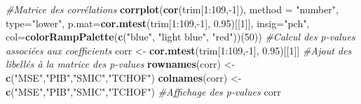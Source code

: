 \documentclass[11pt,]{article}
\newenvironment{Shaded}{\begin{snugshade}}{\end{snugshade}}
\newcommand{\KeywordTok}[1]{\textcolor[rgb]{0.13,0.29,0.53}{\textbf{{#1}}}}
\newcommand{\DataTypeTok}[1]{\textcolor[rgb]{0.13,0.29,0.53}{{#1}}}
\newcommand{\DecValTok}[1]{\textcolor[rgb]{0.00,0.00,0.81}{{#1}}}
\newcommand{\FloatTok}[1]{\textcolor[rgb]{0.00,0.00,0.81}{{#1}}}
\newcommand{\StringTok}[1]{\textcolor[rgb]{0.31,0.60,0.02}{{#1}}}
\newcommand{\CommentTok}[1]{\textcolor[rgb]{0.56,0.35,0.01}{\textit{{#1}}}}
\newcommand{\NormalTok}[1]{{#1}}
\begin{document}
\begin{Shaded}
\begin{Highlighting}[]
\CommentTok{#Matrice des corrélations}
\KeywordTok{corrplot}\NormalTok{(}\KeywordTok{cor}\NormalTok{(trim[}\DecValTok{1}\NormalTok{:}\DecValTok{109}\NormalTok{,-}\DecValTok{1}\NormalTok{]), }\DataTypeTok{method =} \StringTok{"number"}\NormalTok{, }\DataTypeTok{type=}\StringTok{"lower"}\NormalTok{,}
         \DataTypeTok{p.mat=}\KeywordTok{cor.mtest}\NormalTok{(trim[}\DecValTok{1}\NormalTok{:}\DecValTok{109}\NormalTok{,-}\DecValTok{1}\NormalTok{], }\FloatTok{0.95}\NormalTok{)[[}\DecValTok{1}\NormalTok{]], }\DataTypeTok{insig=}\StringTok{"pch"}\NormalTok{,}
         \DataTypeTok{col=}\KeywordTok{colorRampPalette}\NormalTok{(}\KeywordTok{c}\NormalTok{(}\StringTok{"blue"}\NormalTok{, }\StringTok{"light blue"}\NormalTok{, }\StringTok{"red"}\NormalTok{))(}\DecValTok{50}\NormalTok{))}
\CommentTok{#Calcul des p-values associées aux coefficients}
\NormalTok{corr <-}\StringTok{ }\KeywordTok{cor.mtest}\NormalTok{(trim[}\DecValTok{1}\NormalTok{:}\DecValTok{109}\NormalTok{,-}\DecValTok{1}\NormalTok{], }\FloatTok{0.95}\NormalTok{)[[}\DecValTok{1}\NormalTok{]]}
\CommentTok{#Ajout des libellés à la matrice des p-values}
\KeywordTok{rownames}\NormalTok{(corr) <-}\StringTok{ }\KeywordTok{c}\NormalTok{(}\StringTok{"MSE"}\NormalTok{,}\StringTok{"PIB"}\NormalTok{,}\StringTok{"SMIC"}\NormalTok{,}\StringTok{"TCHOF"}\NormalTok{)}
\KeywordTok{colnames}\NormalTok{(corr) <-}\StringTok{ }\KeywordTok{c}\NormalTok{(}\StringTok{"MSE"}\NormalTok{,}\StringTok{"PIB"}\NormalTok{,}\StringTok{"SMIC"}\NormalTok{,}\StringTok{"TCHOF"}\NormalTok{)}
\CommentTok{#Affichage des p-values}
\NormalTok{corr}


\end{Highlighting}
\end{Shaded}
\end{document}
